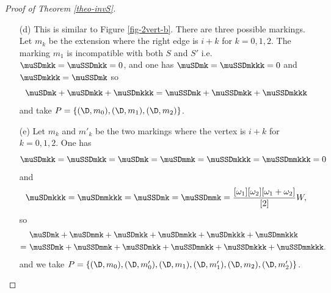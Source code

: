 \begin{proof}[Proof of Theorem \ref{theo-invS}]
\begin{enumerate}[label=(\alph*)]
\begin{figure}[h]
\begin{tikzpicture}[scale=1]
\end{tikzpicture}
\caption{Passing from case (c) to case (b).}


	\label{fig-1vertA+}
\end{figure}

Let $\D'$ be the floor diagram of case (c) which gives the diagram $\D$ of case (b) with the $A^+$ operation of Figure \ref{fig-1vertA+}. Let $m'_k$ be the marking of $\D'$ where the right edge is $i+k$ for $k=0,1,2$. 
One has :

\begin{itemize}
 \item $\muSDDmk = \dfrac{[\omega_1][\omega_2-\omega_1][\omega_2]}{[2]} W$ and $\muSSDDmk = [\omega_1]^2 [\omega_2-\omega_1]_2 W$,
 
 \item $\muSDDmkk = \dfrac{[\omega_1][\omega_2-\omega_1][\omega_2]}{[2]} W$ and $\muSSDDmkk = 0$,
 
 \item $\muSDDmkkk = [\omega_1]^2 [\omega_2-\omega_1]_2 W$ and $\muSSDDmkkk = 0$.
\end{itemize}

For $\D$ we have  $\muSDm = [\omega_1]^2 [\omega_2]_2 W$ and $\muSSDm = [\omega_1]_2 [\omega_2]^2 W$. Hence taking $a=\omega_1$ and $b=\omega_2 - \omega_1$ in lemma \ref{lem-quantum} we see that 
   \begin{align*}
       &\ \muSDm + \muSDDmk + \muSDDmkk + \muSDDmkkk \\
       =&\ \muSSDm + \muSSDDmk + \muSSDDmkk + \muSSDDmkkk
   \end{align*}
and we can take $P=\{ (\D,m), (\D',m'_0), (\D',m'_1), (\D',m'_2) \}$.
If $\omega_1 > \omega_2$ the proof is analogous using the symmetric case of Figure \ref{fig-1vert-c} and an operation $A^-$.


\item[(d)] This is similar to Figure \ref{fig-2vert-b}. There are three possible markings. Let $m_k$ be the extension where the right edge is $i+k$ for $k=0,1,2$. The marking $m_1$ is incompatible with both $S$ and $S'$ i.e.  $\muSDmkk = \muSSDmkk = 0$, and one has $\muSDmk = \muSSDmkkk = 0$ and $\muSDmkkk = \muSSDmk$ so
\[  \muSDmk + \muSDmkk + \muSDmkkk = \muSSDmk + \muSSDmkk + \muSSDmkkk \]
and take $P =\{ (\D,m_0),(\D,m_1),(\D,m_2) \}$.

\item[(e)] Let $m_k$ and $m'_k$ be the two markings where the vertex is $i+k$ for $k=0,1,2$. One has
\[ \muSDmkk = \muSSDmkk = \muSDmk = \muSDmmk = \muSSDmkkk = \muSSDmmkkk = 0 \]
and 
\[ \muSDmkkk = \muSDmmkkk = \muSSDmk = \muSSDmmk = \dfrac{[\omega_1][\omega_2][\omega_1+\omega_2]}{[2]} W, \]
 so
\begin{align*}
    &\ \muSDmk + \muSDmmk + \muSDmkk + \muSDmmkk + \muSDmkkk + \muSDmmkkk  \\
    =&\ \muSSDmk + \muSSDmmk + \muSSDmkk + \muSSDmmkk + \muSSDmkkk + \muSSDmmkkk.
\end{align*} 
and we take $P = \{ (\D,m_0), (\D,m'_0), (\D,m_1), (\D,m'_1), (\D,m_2), (\D,m'_2) \}$.



\end{enumerate}
\end{proof}

